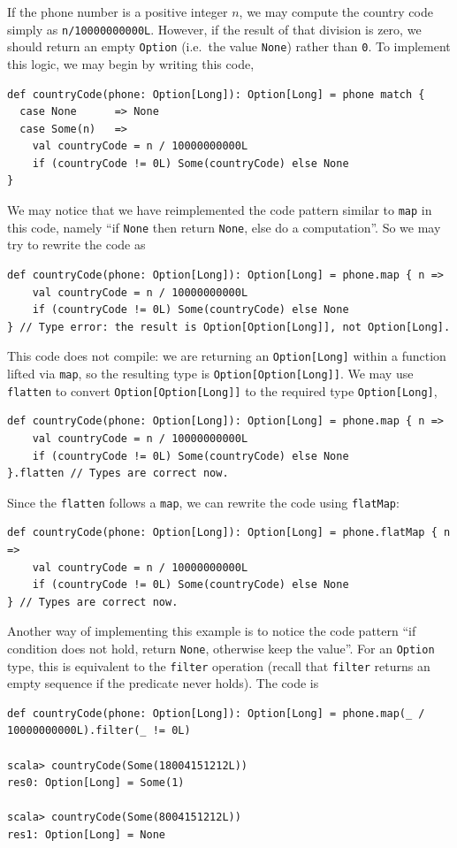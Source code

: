 If the phone number is a positive integer $n$, we may compute the
country code simply as \lstinline!n/10000000000L!. However, if the
result of that division is zero, we should return an empty \lstinline!Option!
(i.e.~the value \lstinline!None!) rather than \lstinline!0!. To
implement this logic, we may begin by writing this code,
\begin{lstlisting}
def countryCode(phone: Option[Long]): Option[Long] = phone match {
  case None      => None
  case Some(n)   =>
    val countryCode = n / 10000000000L
    if (countryCode != 0L) Some(countryCode) else None 
}
\end{lstlisting}
We may notice that we have reimplemented the code pattern similar
to \lstinline!map! in this code, namely \textsf{``}if \lstinline!None! then
return \lstinline!None!, else do a computation\textsf{''}. So we may try
to rewrite the code as
\begin{lstlisting}
def countryCode(phone: Option[Long]): Option[Long] = phone.map { n =>
    val countryCode = n / 10000000000L
    if (countryCode != 0L) Some(countryCode) else None 
} // Type error: the result is Option[Option[Long]], not Option[Long].
\end{lstlisting}
This code does not compile: we are returning an \lstinline!Option[Long]!
within a function lifted via \lstinline!map!, so the resulting type
is \lstinline!Option[Option[Long]]!. We may use \lstinline!flatten!
to convert \lstinline!Option[Option[Long]]! to the required type
\lstinline!Option[Long]!,
\begin{lstlisting}
def countryCode(phone: Option[Long]): Option[Long] = phone.map { n =>
    val countryCode = n / 10000000000L
    if (countryCode != 0L) Some(countryCode) else None 
}.flatten // Types are correct now.
\end{lstlisting}
Since the \lstinline!flatten! follows a \lstinline!map!, we can
rewrite the code using \lstinline!flatMap!:
\begin{lstlisting}
def countryCode(phone: Option[Long]): Option[Long] = phone.flatMap { n =>
    val countryCode = n / 10000000000L
    if (countryCode != 0L) Some(countryCode) else None 
} // Types are correct now.
\end{lstlisting}
Another way of implementing this example is to notice the code pattern
\textsf{``}if condition does not hold, return \lstinline!None!, otherwise
keep the value\textsf{''}. For an \lstinline!Option! type, this is equivalent
to the \lstinline!filter! operation (recall that \lstinline!filter!
returns an empty sequence if the predicate never holds). The code
is
\begin{lstlisting}
def countryCode(phone: Option[Long]): Option[Long] = phone.map(_ / 10000000000L).filter(_ != 0L)

scala> countryCode(Some(18004151212L))
res0: Option[Long] = Some(1)

scala> countryCode(Some(8004151212L))
res1: Option[Long] = None
\end{lstlisting}


